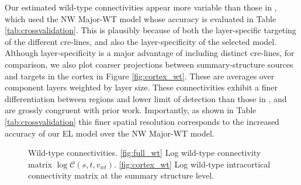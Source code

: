 Our estimated wild-type connectivities appear more variable than those in \citet{Knox2019-ot}, which used the NW Major-WT model whose accuracy is evaluated in Table \ref{tab:crossvalidation}.
This is plausibly because of both the layer-specific targeting of the different cre-lines, and also the layer-specificity of the selected model.
Although layer-specificity is a major advantage of including distinct cre-lines, for comparison, we also plot coarser projections between summary-structure sources and targets in the cortex in Figure \ref{fig:cortex_wt}.
These are averages over component layers weighted by layer size.
These connectivities exhibit a finer differentiation between regions and lower limit of detection than those in \citet{Knox2019-ot}, and are grossly congruent with prior work.
Importantly, as shown in Table \ref{tab:crossvalidation} this finer spatial resolution corresponds to the increased accuracy of our EL model over the NW Major-WT model.

\newpage

\begin{figure}[H]
\centering
        \newline
   \caption{Wild-type connectivities.
   \ref{fig:full_wt} Log wild-type connectivity matrix $\log \mathcal {C} (s,t,v_{wt})$.
   \ref{fig:cortex_wt} Log wild-type intracortical connectivity matrix at the summary structure level.}
   \label{fig:connectome}
\end{figure}


